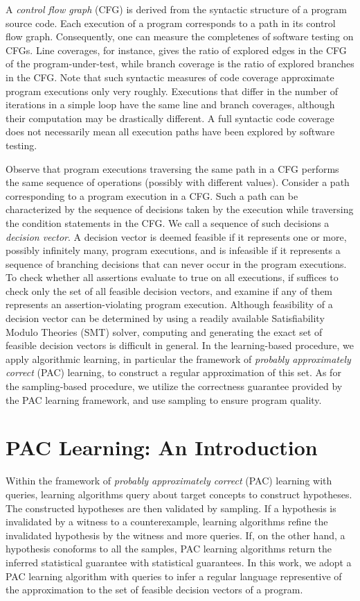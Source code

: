 A \emph{control flow graph} (CFG) is derived from the syntactic structure of a program source code. Each execution of a program corresponds to a path in its control flow graph. Consequently, one can measure the completenes of software testing on CFGs. Line coverages, for instance, gives the ratio of explored edges in the CFG of the program-under-test, while branch coverage is the ratio of explored branches in the CFG. Note that such syntactic measures of code coverage approximate program executions only very roughly. Executions that differ in the number of iterations in a simple loop have the same line and branch coverages, although their computation may be drastically different. A full syntactic code coverage does not necessarily mean all execution paths have been explored by software testing.

Observe that program executions traversing the same path in a CFG performs the same sequence of operations (possibly with different values). Consider a path corresponding to a program execution in a CFG. Such a path can be characterized by the sequence of decisions taken by the execution while traversing the condition statements in the CFG. We call a sequence of such decisions a \emph{decision vector}. A decision vector is deemed feasible if it represents one or more, possibly infinitely many, program executions, and is infeasible if it represents a sequence of branching decisions that can never occur in the program executions. To check whether all assertions evaluate to true on all executions, if suffices to check only the set of all feasible decision vectors, and examine if any of them represents an assertion-violating program execution. Although feasibility of a decision vector can be determined by using a readily available Satisfiability Modulo Theories (SMT) solver, computing and generating the exact set of feasible decision vectors is difficult in general. In the learning-based procedure, we apply algorithmic learning, in particular the framework of \emph{probably approximately correct} (PAC) learning, to construct a regular approximation of this set. As for the sampling-based procedure, we utilize the correctness guarantee provided by the PAC learning framework, and use sampling to ensure program quality. 

\section{PAC Learning: An Introduction}\label{sec:intro_pac}

Within the framework of \emph{probably approximately correct} (PAC) learning with queries, learning algorithms query about target concepts to construct hypotheses. The constructed hypotheses are then validated by sampling. If a hypothesis is invalidated by a witness to a counterexample, learning algorithms refine the invalidated hypothesis by the witness and more queries. If, on the other hand, a hypothesis conoforms to all the samples, PAC learning algorithms return the inferred statistical guarantee with statistical guarantees. In this work, we adopt a PAC learning algorithm with queries to infer a regular language representive of the approximation to the set of feasible decision vectors of a program.

